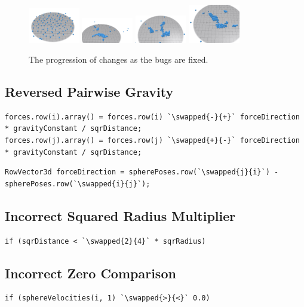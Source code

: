 \documentclass[12pt, a4paper]{article}
\newcommand{\highlight}[2]{\colorbox{#1}{\vphantom{Ay}#2}}
\newcommand{\removed}[1]{\highlight{pink}{#1}}
\newcommand{\added}[1]{\highlight{lime}{#1}}
\newcommand{\swapped}[2]{\removed{#1}\added{#2}}
\newcommand{\inline}[1]{\fbox{\texttt{#1}}}
\begin{document}
    \begin{figure}[H]
        \centering
        \includegraphics[width=0.2\textwidth]{images/2-0.png}
        \includegraphics[width=0.2\textwidth]{images/2-2.png}
        \includegraphics[width=0.2\textwidth]{images/2-3.png}
        \includegraphics[width=0.2\textwidth]{images/2-4.png}
            \caption{The progression of changes as the bugs are fixed.}
            \label{fig:2}
    \end{figure}

    \subsection{Reversed Pairwise Gravity}
        \begin{lstlisting}[caption={The \inline{+} and \inline{-} have been swapped.}, label={lst:d1}]
forces.row(i).array() = forces.row(i) `\swapped{-}{+}` forceDirection * gravityConstant / sqrDistance;
forces.row(j).array() = forces.row(j) `\swapped{+}{-}` forceDirection * gravityConstant / sqrDistance;
\end{lstlisting}
        \begin{lstlisting}[caption={The \inline{i} and \inline{j} have been swapped.}, label={lst:d2}]
RowVector3d forceDirection = spherePoses.row(`\swapped{j}{i}`) - spherePoses.row(`\swapped{i}{j}`);
\end{lstlisting}

    \subsection{Incorrect Squared Radius Multiplier}
        \begin{lstlisting}[caption={The \inline{2} has been replaced with \inline{4}.}, label={lst:e1}]
if (sqrDistance < `\swapped{2}{4}` * sqrRadius)
\end{lstlisting}

    \subsection{Incorrect Zero Comparison}
        \begin{lstlisting}[caption={The \inline{>} has been swapped with \inline{<}.}, label={lst:f1}]
if (sphereVelocities(i, 1) `\swapped{>}{<}` 0.0)
\end{lstlisting}
\end{document}
